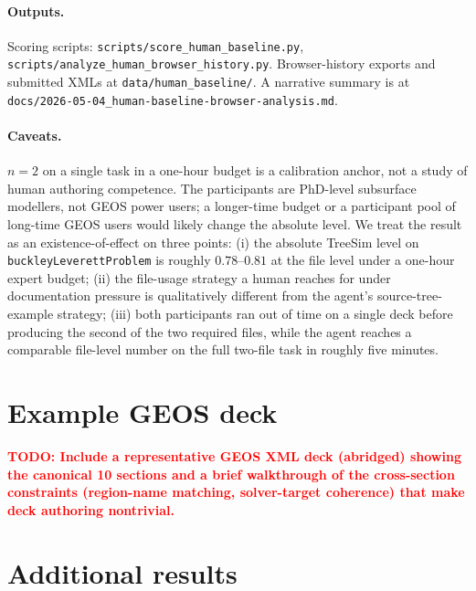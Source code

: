 \documentclass{article}
\newcommand{\todo}[1]{\textcolor{red}{\textbf{TODO: #1}}}
\begin{document}
\paragraph{Outputs.} Scoring scripts: \texttt{scripts/score\_human\_baseline.py}, \texttt{scripts/analyze\_human\_browser\_history.py}. Browser-history exports and submitted XMLs at \texttt{data/human\_baseline/}. A narrative summary is at \texttt{docs/2026-05-04\_human-baseline-browser-analysis.md}.

\paragraph{Caveats.} $n=2$ on a single task in a one-hour budget is a calibration anchor, not a study of human authoring competence. The participants are PhD-level subsurface modellers, not GEOS power users; a longer-time budget or a participant pool of long-time GEOS users would likely change the absolute level. We treat the result as an existence-of-effect on three points: (i) the absolute TreeSim level on \texttt{buckleyLeverettProblem} is roughly $0.78$--$0.81$ at the file level under a one-hour expert budget; (ii) the file-usage strategy a human reaches for under documentation pressure is qualitatively different from the agent's source-tree-example strategy; (iii) both participants ran out of time on a single deck before producing the second of the two required files, while the agent reaches a comparable file-level number on the full two-file task in roughly five minutes.

\section{Example GEOS deck}
\label{app:geos-example}

\todo{Include a representative GEOS XML deck (abridged) showing the canonical 10 sections and a brief walkthrough of the cross-section constraints (region-name matching, solver-target coherence) that make deck authoring nontrivial.}

\section{Additional results}
\label{app:results}
\end{document}
